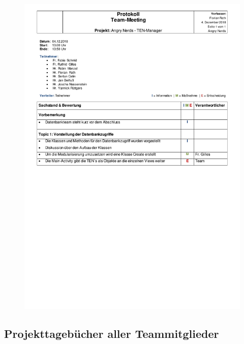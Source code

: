 \begin{figure}[H]
\centering
\begin{minipage}[t]{1\textwidth} %
\includegraphics[width=1\textwidth]{img/Protokoll2018-12-04.pdf}\\ %
\end{minipage}
\end{figure}

\subsection{Projekttagebücher aller Teammitglieder}
